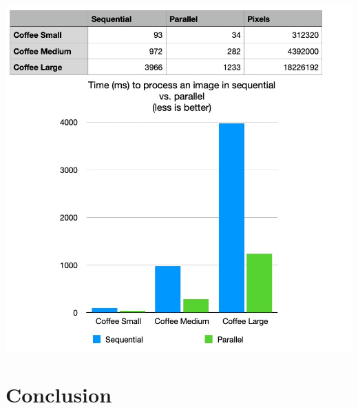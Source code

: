 \documentclass{article}
\begin{document}
\begin{multicols}{2}
    \noindent\includegraphics[width=\linewidth]{img/coffee_speedup.jpg}

    \section{Conclusion}
    \newpage

\end{multicols}

\printbibliography[heading=bibintoc, title={References}]
\end{document}
